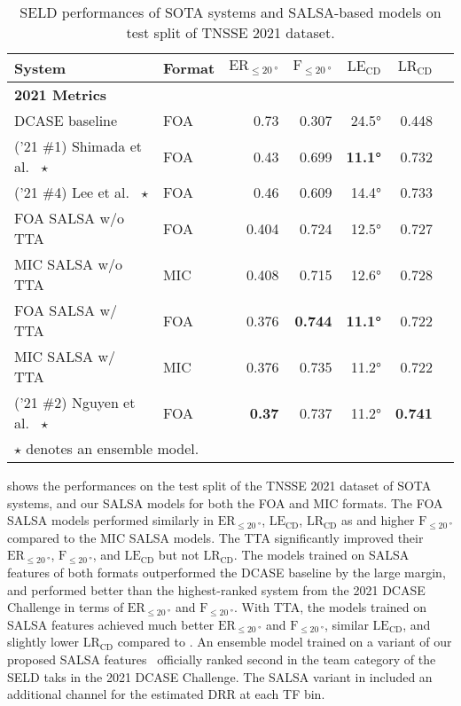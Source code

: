 \documentclass[journal]{IEEEtran}
\newcommand{\etalcite}[1]{ et al.~\cite{#1}}
\newcommand{\ER}{$\text{ER}_{\le \SI{20}{\degree}}$\xspace}
\newcommand{\Fone}{$\text{F}_{\le \SI{20}{\degree}}$\xspace}
\newcommand{\LE}{$\text{LE}_\text{CD}$\xspace}
\newcommand{\LR}{$\text{LR}_\text{CD}$\xspace}
\begin{document}
\begin{table}[t] \small
    \centering
    \caption{SELD performances of SOTA systems and SALSA-based models on test split of TNSSE 2021 dataset.}
    
    \setlength{\tabcolsep}{3pt}
    \footnotesize
    \noindent\begin{tabularx}{\columnwidth}{Xlrrrrr}
    \toprule 
        System
        & Format
        & $\text{ER}_{\le \SI{20}{\degree}}$ 
        & $\text{F}_{\le \SI{20}{\degree}}$
        & $\text{LE}_\text{CD}$
        & $\text{LR}_\text{CD}$ \\
    \midrule
    \bfseries 2021 Metrics \\
        DCASE baseline~\cite{Politis2021}
            & FOA & 0.73\hphantom{0} & 0.307 & 24.5\si{\degree} & 0.448 \\
        ('21 \#1) Shimada\etalcite{Shimada2021EnsembleDetection} $\star$
            & FOA & 0.43\hphantom{0} & 0.699 & \bf{11.1\si{\degree}} & 0.732 \\
        ('21 \#4) Lee\etalcite{Lee2021SoundChallenge} $\star$
            & FOA & 0.46\hphantom{0} & 0.609 & 14.4\si{\degree} & 0.733 \\
    \midrule
        FOA SALSA w/o TTA
            & FOA & 0.404 & 0.724 & 12.5\si{\degree} & 0.727 \\
        MIC SALSA w/o TTA
            & MIC & 0.408 & 0.715 & 12.6\si{\degree} & 0.728 \\ 
        FOA SALSA w/ TTA
            & FOA & 0.376 & \bf{0.744} & \bf{11.1\si{\degree}} & 0.722 \\
        MIC SALSA w/ TTA
            & MIC & 0.376 & 0.735 & 11.2\si{\degree} & 0.722 \\ 
        ('21 \#2) Nguyen\etalcite{Nguyen2021DCASEDetection} $\star$
            & FOA & \bf{0.37\hphantom{0}} & 0.737 & 11.2\si{\degree} & \bf{0.741} \\
    \bottomrule
    \multicolumn{2}{l}{$\star$ denotes an ensemble model.}
    \end{tabularx}
    \label{tab:sota_2021_dev}
\end{table}

 shows the performances on the test split of the TNSSE 2021 dataset of SOTA systems, and our SALSA models for both the FOA and MIC formats. The FOA SALSA models performed similarly in \ER, \LE, \LR as and higher \Fone compared to the MIC SALSA models. The TTA significantly improved their \ER, \Fone, and \LE but not \LR. The models trained on SALSA features of both formats outperformed the DCASE baseline by the large margin, and performed better than the highest-ranked system from the 2021 DCASE Challenge \cite{Shimada2021EnsembleDetection} in terms of \ER and \Fone. With TTA, the models trained on SALSA features achieved much better \ER and \Fone, similar \LE, and slightly lower \LR compared to \cite{Shimada2021EnsembleDetection}. An ensemble model trained on a variant of our proposed SALSA features~\cite{Nguyen2021DCASEDetection} officially ranked second in the team category of the SELD taks in the 2021 DCASE Challenge. The SALSA variant in \cite{Nguyen2021DCASEDetection} included an additional channel for the estimated DRR at each TF bin. 
\end{document}
